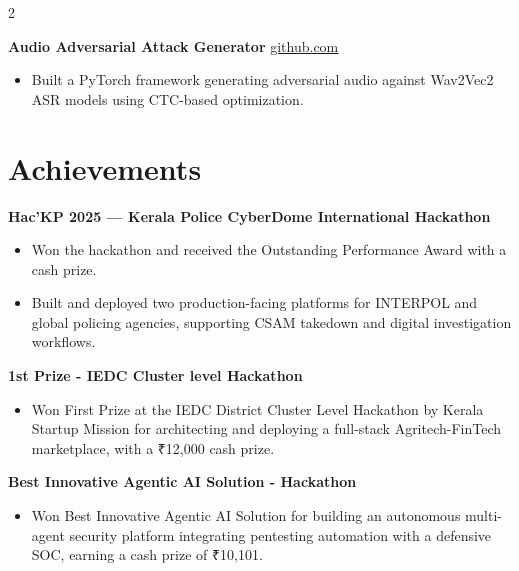 \documentclass[10pt, a4paper]{article}
\newenvironment{highlights}{
    \begin{itemize}[
        topsep=0.10 cm,
        parsep=0.10 cm,
        partopsep=0pt,
        itemsep=0pt,
        leftmargin=0 cm + 10pt
    ]
}{
    \end{itemize}
} %
\newenvironment{twocolentry}[2][]{
    \onecolentry
    \def\secondColumn{#2}
    \setcolumnwidth{\fill, 4.5 cm}
    \begin{paracol}{2}
}{
    \switchcolumn \raggedleft \secondColumn
    \end{paracol}
    \endonecolentry
} %
\begin{document}
        \vspace{0.01 cm}

        \begin{twocolentry}{
            \href{https://github.com/TimsTittus/Audio-Adversarial-Attack-Generator}{\underline{github.com}}
        }
            \textbf{Audio Adversarial Attack Generator}\end{twocolentry}

        \vspace{0.01 cm}

            \begin{highlights}
                \item Built a PyTorch framework generating adversarial audio against Wav2Vec2 ASR models using CTC-based optimization.
            \end{highlights}

        \vspace{0.01 cm}

   \section{Achievements}

                \textbf{Hac'KP 2025 — Kerala Police CyberDome International Hackathon}
                \begin{highlights}
                    \item Won the hackathon and received the Outstanding Performance Award with a cash prize.
                    \item Built and deployed two production-facing platforms for INTERPOL and global policing agencies, supporting CSAM takedown and digital investigation workflows.
                \end{highlights}

                \textbf{1st Prize - IEDC Cluster level Hackathon}
              \begin{highlights}
                  \item Won First Prize at the IEDC District Cluster Level Hackathon by Kerala Startup Mission for architecting and deploying a full-stack Agritech-FinTech marketplace, with a ₹12,000 cash prize.
              \end{highlights}

                \textbf{Best Innovative Agentic AI Solution - Hackathon}
                \begin{highlights}
                    \item Won Best Innovative Agentic AI Solution for building an autonomous multi-agent security platform integrating pentesting automation with a defensive SOC, earning a cash prize of ₹10,101.
                \end{highlights}
\end{document}

